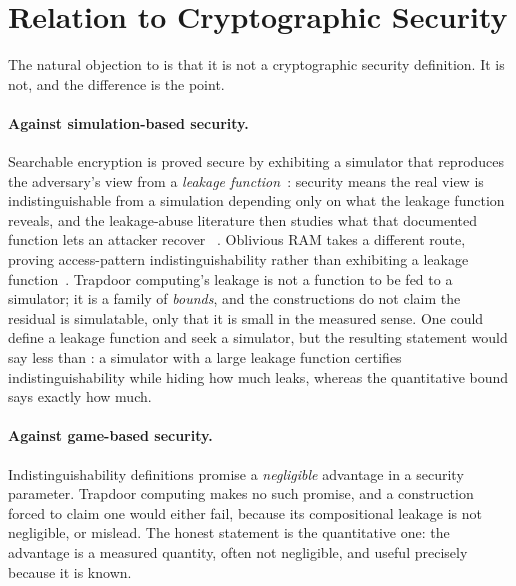 \documentclass[11pt]{article}
\theoremstyle{definition}
\theoremstyle{plain}
\theoremstyle{remark}
\begin{document}
\section{Relation to Cryptographic Security}
\label{sec:crypto}

The natural objection to  is that it is not a
cryptographic security definition. It is not, and the difference is the point.

\paragraph{Against simulation-based security.}
Searchable encryption is proved secure by exhibiting a simulator that reproduces
the adversary's view from a \emph{leakage function}~\cite{curtmola2006searchable}:
security means the real view is indistinguishable from a simulation depending
only on what the leakage function reveals, and the leakage-abuse literature then
studies what that documented function lets an attacker recover~%
\cite{naveed2015inference,cash2015leakage}. Oblivious RAM takes a different route,
proving access-pattern indistinguishability rather than exhibiting a leakage
function~\cite{goldreich1996software}. Trapdoor computing's leakage is not a
function to be fed to a simulator; it is a family of \emph{bounds}, and the
constructions do not claim the residual is simulatable, only that it is small in
the measured sense. One could define a leakage function and seek a simulator, but
the resulting statement would say less than : a
simulator with a large leakage function certifies indistinguishability while
hiding how much leaks, whereas the quantitative bound says exactly how much.

\paragraph{Against game-based security.}
Indistinguishability definitions promise a \emph{negligible} advantage in a
security parameter. Trapdoor computing makes no such promise, and a construction
forced to claim one would either fail, because its compositional leakage is not
negligible, or mislead. The honest statement is the quantitative one: the
advantage is a measured quantity, often not negligible, and useful precisely
because it is known.
\end{document}
